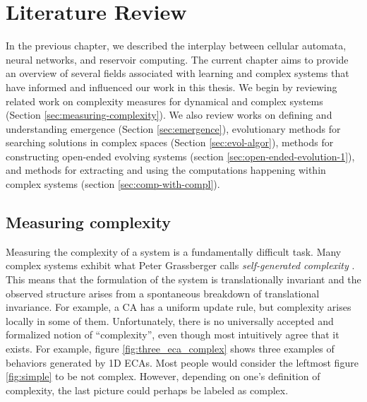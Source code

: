 \chapter{Literature Review}
\label{cha:literature-review}

In the previous chapter, we described the interplay between cellular 
automata, neural networks, and reservoir computing. The current chapter aims to 
provide an overview of several fields associated with learning and complex
systems that have informed and influenced our work in this thesis. We begin by reviewing related
work on complexity measures for dynamical and complex systems (Section
\ref{sec:measuring-complexity}). We also review works on defining and
understanding emergence (Section \ref{sec:emergence}), evolutionary methods for
searching solutions in complex spaces (Section \ref{sec:evol-algor}), methods
for constructing open-ended evolving systems (section
\ref{sec:open-ended-evolution-1}), and methods for extracting and using the
computations happening within complex systems (section
\ref{sec:comp-with-compl}).

\section{Measuring complexity\label{sec:measuring-complexity}}

Measuring the complexity of a system is a fundamentally difficult task. Many
complex systems exhibit what Peter Grassberger calls \emph{self-generated
  complexity} \parencite{grassbergerQuantitativeTheorySelfgenerated1986}. This
means that the formulation of the system is translationally invariant and the
observed structure arises from a spontaneous breakdown of translational
invariance. For example, a \ac{CA} has a uniform update rule, but complexity 
arises locally in some of them. Unfortunately, there is no universally accepted and formalized notion
of ``complexity'', even though most intuitively agree that it exists. For
example, figure \ref{fig:three_eca_complex} shows three examples of behaviors
generated by 1D \acp{ECA}. Most people would consider the leftmost figure
\ref{fig:simple} to be not complex. However, depending on one's definition of
complexity, the last picture could perhaps be labeled as complex.


